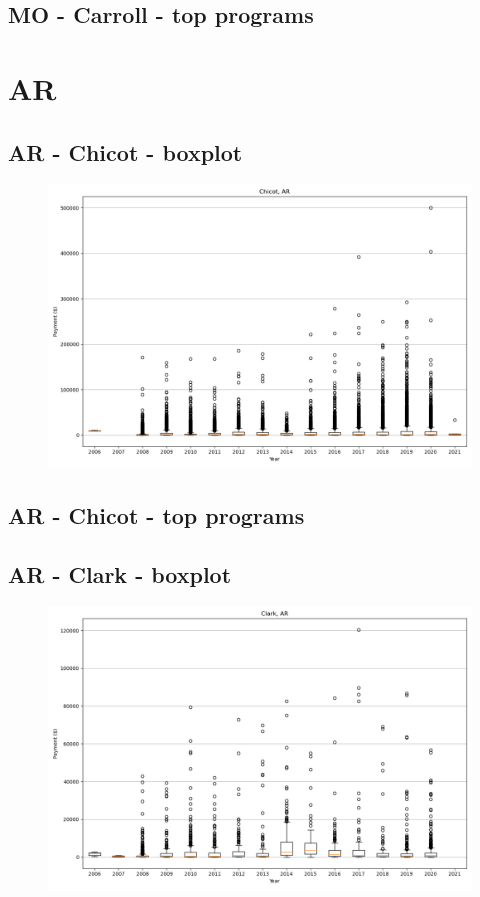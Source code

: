 \subsection*{MO - Carroll - top programs}

\newpage
\section*{AR}
\subsection*{AR - Chicot - boxplot}
\begin{figure}[h]
\centering
\includegraphics[width=7in]{../output/boxplots/counties/Chicot-AR_boxplot.png}
\end{figure}


\subsection*{AR - Chicot - top programs}

\newpage
\subsection*{AR - Clark - boxplot}
\begin{figure}[h]
\centering
\includegraphics[width=7in]{../output/boxplots/counties/Clark-AR_boxplot.png}
\end{figure}


